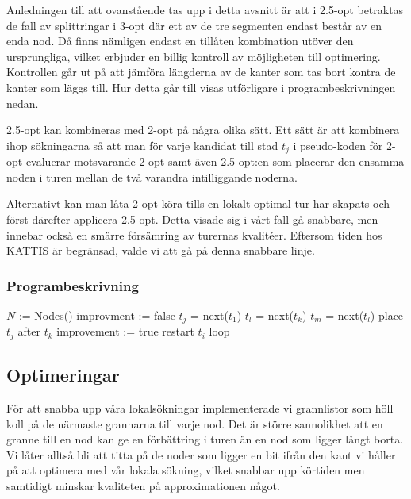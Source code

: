 \documentclass[a4paper,12pt]{article}
\renewcommand{\*}{\ensuremath{\cdot}}
\begin{document}
Anledningen till att ovanstående tas upp i detta avsnitt är att i 2.5-opt
betraktas de fall av splittringar i 3-opt där ett av de tre segmenten endast
består av en enda nod. Då finns nämligen endast en tillåten kombination utöver
den ursprungliga, vilket erbjuder en billig kontroll av möjligheten till
optimering. Kontrollen går ut på att jämföra längderna av de kanter som tas bort
kontra de kanter som läggs till. Hur detta går till visas utförligare i
programbeskrivningen nedan.

2.5-opt kan kombineras med 2-opt på några olika sätt. Ett sätt är att kombinera
ihop sökningarna så att man för varje kandidat till stad $t_j$ i pseudo-koden
för 2-opt evaluerar motsvarande 2-opt samt även 2.5-opt:en som placerar den
ensamma noden i turen mellan de två varandra intilliggande noderna.

Alternativt kan man låta 2-opt köra tills en lokalt optimal tur har skapats och
först därefter applicera 2.5-opt. Detta visade sig i vårt fall gå snabbare, men
innebar också en smärre försämring av turernas kvalitéer. Eftersom tiden hos
KATTIS är begränsad, valde vi att gå på denna snabbare linje.



\subsubsection{Programbeskrivning}

\begin{algorithmic}
    \STATE $N$ := Nodes()
        \STATE improvment := false
            \STATE $t_j$ = next($t_1$)
                \STATE $t_l$ = next($t_k$)
                \STATE $t_m$ = next($t_l$)
                    \STATE place $t_j$ after $t_k$
                    \STATE improvement := true
                    \STATE restart $t_i$ loop
                \ENDIF
            \ENDFOR
        \ENDFOR
    \ENDWHILE
\end{algorithmic}

\subsection{Optimeringar}

För att snabba upp våra lokalsökningar implementerade vi grannlistor som höll
koll på de närmaste grannarna till varje nod. Det är större sannolikhet att en
granne till en nod kan ge en förbättring i turen än en nod som ligger långt
borta. Vi låter alltså bli att titta på de noder som ligger en bit ifrån den
kant vi håller på att optimera med vår lokala sökning, vilket snabbar upp
körtiden men samtidigt minskar kvaliteten på approximationen något.
\end{document}
